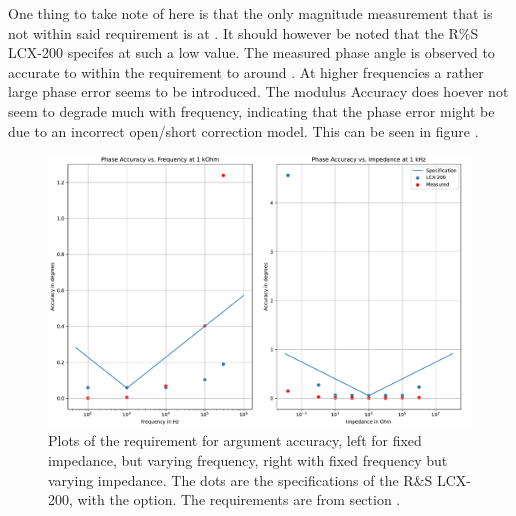One thing to take note of here is that the only magnitude measurement that is not within said requirement is at . It should however be noted that the R\%S LCX-200 specifes  at such a low value.
The measured phase angle is observed to accurate to within the requirement to around . At higher frequencies a rather large phase error seems to be introduced. The modulus Accuracy does hoever not seem to degrade much with frequency, indicating that the phase error might be due to an incorrect open/short correction model. This can be seen in figure .

\begin{figure}[H]
    \centering
    \includegraphics[width=1\textwidth]{Sections/8_SystemVerification/Figures/SpecVTest_Phase.pdf}
    \caption{Plots of the requirement for argument accuracy, left for fixed impedance, but varying frequency, right with fixed frequency but varying impedance. The dots are the specifications of the R\&S LCX-200, with the  option. The requirements are from section .}
    \label{fig_8_ArgumentAccuracy}
\end{figure}
  

